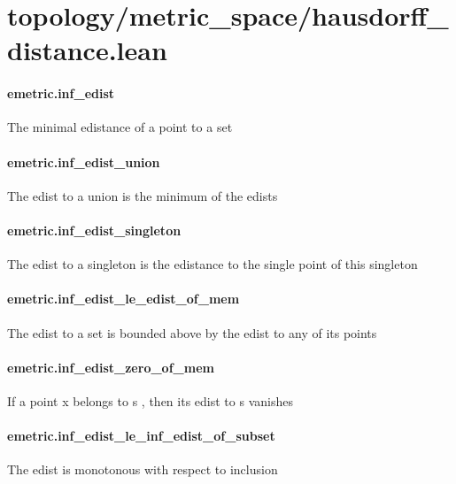 \documentclass{article}
\begin{document}
\section{topology/metric\_space/hausdorff\_distance.lean}\paragraph{emetric.inf\_edist}
\par
The minimal edistance of a point to a set
\paragraph{emetric.inf\_edist\_union}
\par
The edist to a union is the minimum of the edists
\paragraph{emetric.inf\_edist\_singleton}
\par
The edist to a singleton is the edistance to the single point of this singleton
\paragraph{emetric.inf\_edist\_le\_edist\_of\_mem}
\par
The edist to a set is bounded above by the edist to any of its points
\paragraph{emetric.inf\_edist\_zero\_of\_mem}
\par
If a point 
\colorbox[RGB]{253,246,227}{{{{\color[RGB]{101, 123, 131} x }}}} belongs to 
\colorbox[RGB]{253,246,227}{{{{\color[RGB]{101, 123, 131} s }}}}, then its edist to 
\colorbox[RGB]{253,246,227}{{{{\color[RGB]{101, 123, 131} s }}}} vanishes
\paragraph{emetric.inf\_edist\_le\_inf\_edist\_of\_subset}
\par
The edist is monotonous with respect to inclusion
\end{document}
